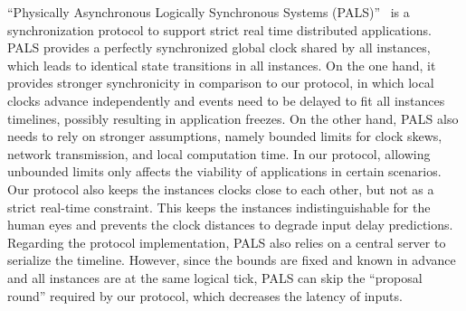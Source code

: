\documentclass[sigplan,screen]{acmart}
\begin{document}
``Physically Asynchronous Logically Synchronous Systems (PALS)''~\cite{gals.pals}
is a synchronization protocol to support strict real time distributed
applications.
PALS provides a perfectly synchronized global clock shared by all instances,
which leads to identical state transitions in all instances.
On the one hand, it provides stronger synchronicity in comparison to our
protocol, in which local clocks advance independently and events need to be
delayed to fit all instances timelines, possibly resulting in application
freezes.
On the other hand, PALS also needs to rely on stronger assumptions, namely
bounded limits for clock skews, network transmission, and local computation
time.
In our protocol, allowing unbounded limits only affects the viability of
applications in certain scenarios.
Our protocol also keeps the instances clocks close to each other, but not as a
strict real-time constraint.
This keeps the instances indistinguishable for the human eyes and prevents the
clock distances to degrade input delay predictions.
%
Regarding the protocol implementation, PALS also relies on a central server to
serialize the timeline.
However, since the bounds are fixed and known in advance and all instances are
at the same logical tick, PALS can skip the ``proposal round'' required by our
protocol, which decreases the latency of inputs.

\end{document}
